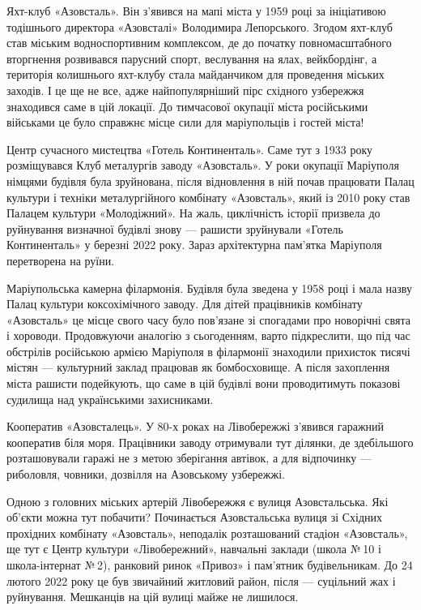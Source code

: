Яхт-клуб «Азовсталь». Він з'явився на мапі міста у 1959 році за ініціативою
тодішнього директора «Азовсталі» Володимира Лепорського. Згодом яхт-клуб став
міським водноспортивним комплексом, де до початку повномасштабного вторгнення
розвивався парусний спорт, веслування на ялах, вейкбордінг, а територія
колишнього яхт-клубу стала майданчиком для проведення міських заходів. І це ще
не все, адже найпопулярніший пірс східного узбережжя знаходився саме в цій
локації. До тимчасової окупації міста російськими військами це було справжнє
місце сили для маріупольців і гостей міста!

Центр сучасного мистецтва «Готель Континенталь». Саме тут з 1933 року
розміщувався Клуб металургів заводу «Азовсталь». У роки окупації Маріуполя
німцями будівля була зруйнована, після відновлення в ній почав працювати Палац
культури і техніки металургійного комбінату «Азовсталь», який із 2010 року став
Палацем культури «Молодіжний». На жаль, циклічність історії призвела до
руйнування визначної будівлі знову — рашисти зруйнували «Готель Континенталь» у
березні 2022 року. Зараз архітектурна пам'ятка Маріуполя перетворена на руїни.

Маріупольська камерна філармонія. Будівля була зведена у 1958 році і мала назву
Палац культури коксохімічного заводу. Для дітей працівників комбінату
«Азовсталь» це місце свого часу було пов'язане зі спогадами про новорічні свята
і хороводи. Продовжуючи аналогію з сьогоденням, варто підкреслити, що під час
обстрілів російською армією Маріуполя в філармонії знаходили прихисток тисячі
містян — культурний заклад працював як бомбосховище. А після захоплення міста
рашисти подейкують, що саме в цій будівлі вони проводитимуть показові судилища
над українськими захисниками.

Кооператив «Азовсталець». У 80-х роках на Лівобережжі з'явився гаражний
кооператив біля моря. Працівники заводу отримували тут ділянки, де здебільшого
розташовували гаражі не з метою зберігання автівок, а для відпочинку —
риболовля, човники, дозвілля на Азовському узбережжі.

Одною з головних міських артерій Лівобережжя є вулиця Азовстальська. Які
об'єкти можна тут побачити? Починається Азовстальська вулиця зі Східних
прохідних комбінату «Азовсталь», неподалік розташований стадіон «Азовсталь», ще
тут є Центр культури «Лівобережний», навчальні заклади (школа № 10 і
школа-інтернат № 2), ранковий ринок «Привоз» і пам'ятник будівельникам. До 24
лютого 2022 року це був звичайний житловий район, після — суцільний жах і
руйнування. Мешканців на цій вулиці майже не лишилося.

